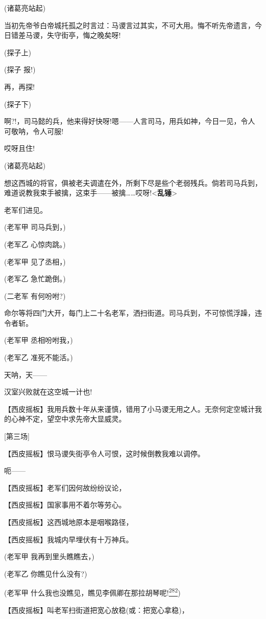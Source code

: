 (诸葛亮站起)

当初先帝爷白帝城托孤之时言过：马谡言过其实，不可大用。悔不听先帝遗言，今日错差马谡，失守街亭，悔之晚矣呀!

(探子上)

(探子 报!)

再，再探!

(探子下)

啊?!，司马懿的兵，他来得好快呀!嗯------人言司马，用兵如神，今日一见，令人可敬呐，令人可服!

哎呀且住!

(诸葛亮站起)

想这西城的将官，俱被老夫调遣在外，所剩下尽是些个老弱残兵。倘若司马兵到，难道说教我束手被擒，这束手------被擒\ldots{}\ldots{}哎呀!\textless{}\textbf{乱锤}\textgreater{}

老军们进见。

(老军甲 司马兵到，)

(老军乙 心惊肉跳。)

(老军甲 见了丞相，)

(老军乙 急忙跪倒。)

(二老军 有何吩咐?)

命尔等将四门大开，每门上二十名老军，洒扫街道。司马兵到，不可惊慌浮躁，违令者斩。

(老军甲 丞相吩咐我，)

(老军乙 准死不能活。)

天呐，天------

汉室兴败就在这空城一计也!

【西皮摇板】我用兵数十年从来谨慎，错用了小马谡无用之人。无奈何定空城计我的心神不定，望空中求先帝大显威灵。

{[}第三场{]}

【西皮摇板】恨马谡失街亭令人可恨，这时候倒教我难以调停。

呃------

【西皮摇板】老军们因何故纷纷议论，

【西皮摇板】国家事用不着尔等劳心。

【西皮摇板】这西城地原本是咽喉路径，

【西皮摇板】我城内早埋伏有十万神兵。

(老军甲 我再到里头瞧瞧去，)

(老军乙 你瞧见什么没有?)

(老军甲
什么我也没瞧见，瞧见李佩卿在那拉胡琴呢!\protect\hyperlink{fn282}{\textsuperscript{282}})

【西皮摇板】叫老军扫街道把宽心放稳(或：把宽心拿稳)，

